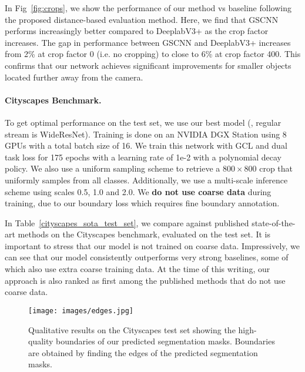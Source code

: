 \documentclass[10pt,twocolumn,letterpaper]{article}
\begin{document}
In Fig~\ref{fig:crops}, we show the performance of our method vs baseline following the proposed distance-based evaluation method. 
Here, we find  that GSCNN performs increasingly better compared to DeeplabV3+ as the crop factor increases. The gap in performance between GSCNN and DeeplabV3+ increases from 2\% at crop factor 0 (i.e. no cropping) to close to 6\% at crop factor 400. 
This confirms that our network achieves significant improvements for smaller objects located further away from the camera.

\vspace{-4mm}
\paragraph{Cityscapes Benchmark.} 
To get optimal performance on the test set, we use our best model (\ie, regular stream is WideResNet). Training is done on an NVIDIA DGX Station using 8 GPUs with a total batch size of 16. We train this network with GCL and dual task loss for 175 epochs with a learning rate of 1e-2 with a polynomial decay policy. We also use a uniform sampling scheme to retrieve a $800 \times 800$ crop that uniformly samples from all classes.
Additionally, we use a multi-scale inference scheme using scales 0.5, 1.0 and 2.0.
We {\bf do not use coarse data} during training, due to our boundary loss which requires fine boundary annotation.

In Table~\ref{cityscapes_sota_test_set}, we compare against published state-of-the-art methods on the Cityscapes benchmark, evaluated on the test set. 
It is important to stress that  our model is not trained on coarse data.
Impressively, we can see that our model consistently outperforms very strong baselines, some of which also use extra coarse training data. At the time of this writing, our approach is also ranked as first among the published methods that do not use coarse data.

\begin{figure*}[th!]
 
\centering
\texttt{[image: images/edges.jpg]} 
\vspace{-7mm}
\caption{Qualitative results on the Cityscapes test set showing the high-quality boundaries of our predicted segmentation masks. Boundaries are obtained by finding the edges of the predicted segmentation masks.}
\label{fig:testsetboundary}
 \vspace{-3mm}
\end{figure*}
\end{document}
